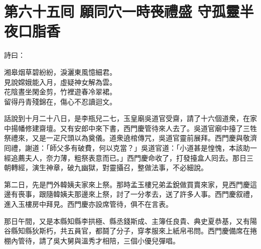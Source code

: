 
\chapter*{第六十五囘 願同穴一時䘮禮盛 守孤靈半夜口脂香}


詩曰：

\begin{myquote} 
湘皋烟草碧紛紛，淚灑東風憶細君。\\見說嫦娥能入月，虛疑神女解為雲。\\花陰晝坐閑金剪，竹裡遊春冷翠裙。\\留得丹青殘錦在，傷心不忍讀迴文。
\end{myquote} 

話說到十月二十八日，是李瓶兒二七，玉皇廟吳道官受齋，請了十六個道衆，在家中揚幡修建齋壇。又有安郎中來下書，西門慶管待來人去了。吳道官廟中擡了三牲祭禮來，又是一疋尺頭以為奠儀。道衆遶棺傳咒，吳道官靈前展拜。西門慶與敬濟囘禮，謝道：「師父多有破費，何以克當？」吳道官道：「小道甚是惶愧，本該助一經追薦夫人，奈力薄，粗祭表意而已。」西門慶命收了，打發擡盒人囘去。那日三朝轉經，演生神章，破九幽獄，對靈攝召，整做法事，不必細說。

第二日，先是門外韓姨夫家來上祭。那時孟玉樓兄弟孟銳做買賣來家，{}見西門慶這邊有䘮事，跟隨韓姨夫那邊來上祭，討了一分孝去，送了許多人事。西門慶叙禮，進入玉樓房中拜見。西門慶亦設席管待，俱不在言表。

那日午間，又是本縣知縣李拱極、縣丞錢斯成、主簿任良貴、典史夏恭基，又有陽谷縣知縣狄斯朽，共五員官，都鬪了分子，穿孝服來上紙帛弔問。西門慶備席在捲棚內管待，請了吳大舅與溫秀才相陪，三個小優兒彈唱。

